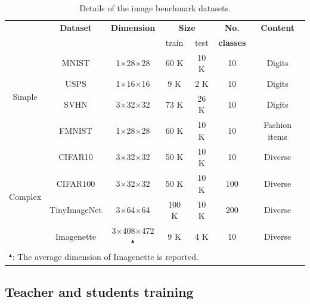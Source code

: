 \begin{table}[ht] %
    \caption{Details of the image benchmark datasets.}
    \centering
    \begin{tabular}{c|c|c|cc|c|c}
        \hline                         & \textbf{Dataset} & \textbf{Dimension} & \multicolumn{2}{c|}{\textbf{Size}} & \textbf{No.} & \textbf{Content}  \\
        & & & train & test & \textbf{classes} & \\
        \hline
        \multirow{4}{*}{Simple} & MNIST  & 1$\times$28$\times$28 & \phantom{0}60 K & 10 K           & \phantom{0}10 & Digits \\
                                & USPS   & 1$\times$16$\times$16 & \phantom{00}9 K & \phantom{0}2 K & \phantom{0}10 & Digits \\
                                & SVHN   & 3$\times$32$\times$32 & \phantom{0}73 K & 26 K           & \phantom{0}10 & Digits \\
                                & FMNIST & 1$\times$28$\times$28 & \phantom{0}60 K & 10 K           & \phantom{0}10 & Fashion items \\
        \hline
        \multirow{4}{*}{Complex} & CIFAR10      &                    3$\times$32$\times$32 & \phantom{0}50 K &           10 K & \phantom{0}10 & Diverse \\
                                 & CIFAR100     &                    3$\times$32$\times$32 & \phantom{0}50 K &           10 K &           100 & Diverse \\
                                 & TinyImageNet &                    3$\times$64$\times$64 &           100 K &           10 K &           200 & Diverse \\
                                 & Imagenette   & 3$\times$408$\times$472$^\blacktriangle$ & \phantom{00}9 K & \phantom{0}4 K & \phantom{0}10 & Diverse \\
        \hline
        \multicolumn{5}{l}{$^\blacktriangle$: The average dimension of Imagenette is reported.} \\
    \end{tabular}
    \label{tab:appendix-training-datasets}
\end{table}


\subsection{Teacher and students training} \label{ssec:app01-teacherstudents}
